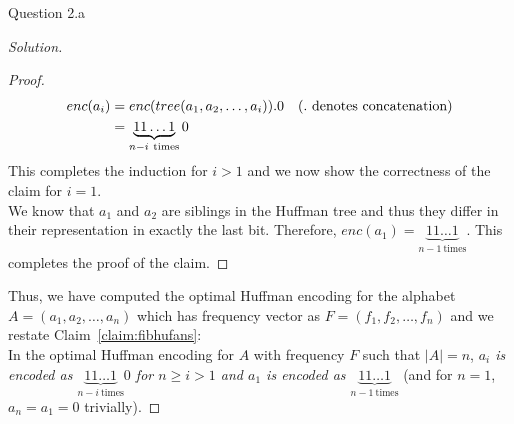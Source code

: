\begin{solution}{Question 2.a}
\begin{proof}[Solution]
\begin{proof}
\begin{equation}
                \begin{split}
                    enc(a_i) &=enc(tree(a_1, a_2, \ldots, a_i)).0\text{\quad(.\ denotes concatenation)}\\
                    &=\underbrace{11\ldots1}_{n-i\ \text{times}}0
                \end{split}
            \end{equation}
            This completes the induction for $i>1$ and we now show the correctness of the claim for $i=1$.\\
            We know that $a_1$ and $a_2$ are siblings in the Huffman tree and thus they differ in their representation in exactly the last bit. Therefore, $enc(a_1)=\underbrace{11\ldots1}_{n-1\ \text{times}}$. This completes the proof of the claim.
        \end{proof}
        Thus, we have computed the optimal Huffman encoding for the alphabet $A=(a_1, a_2, \ldots, a_n)$ which has frequency vector as $F=(f_1, f_2, \ldots, f_n)$ and we restate Claim~\ref{claim:fibhufans}:\\
        In the optimal Huffman encoding for $A$ with frequency $F$ such that $|A|=n$, \textit{$a_i$ is encoded as $\underbrace{11\ldots1}_{n-i\ \text{times}}0$ for $n\geq i>1$ and $a_1$ is encoded as $\underbrace{11\ldots1}_{n-1\ \text{times}}$} (and for $n=1$, $a_n=a_1=0$ trivially).
    \end{proof}
\end{solution}
